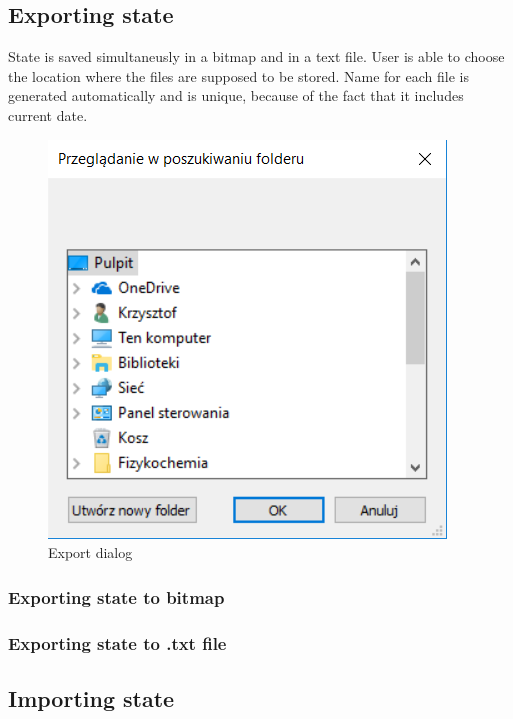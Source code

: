 \documentclass[a4paper, 11pt]{article}
\begin{document}
\subsection{Exporting state}
State is saved simultaneusly in a bitmap and in a text file. User is able to choose the location where the files are supposed to be stored. Name for each file is generated automatically and is unique, because of the fact that it includes current date.

\begin{figure}[H]
\centering
  \includegraphics[]{ExportTo}
  \caption{Export dialog}
  \label{fig:boat1}
\end{figure}

\subsubsection{Exporting state to bitmap}
\subsubsection{Exporting state to .txt file}

\subsection{Importing state}
\end{document}
